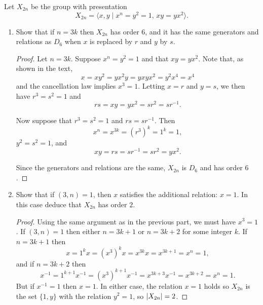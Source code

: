  Let $X_{2n}$ be the group with presentation
\begin{equation*}
  X_{2n} = \langle x, y \mid x^n = y^2 = 1,\,xy = yx^2\rangle.
\end{equation*}
\begin{enumerate}
\item Show that if $n = 3k$ then $X_{2n}$ has order $6$, and it has
  the same generators and relations as $D_6$ when $x$ is replaced by
  $r$ and $y$ by $s$.
  \begin{proof}
    Let $n = 3k$. Suppose $x^n = y^2 = 1$ and that $xy =
    yx^2$. Note that, as shown in the text,
    \begin{equation*}
      x = xy^2 = yx^2y = yxyx^2 = y^2x^4 = x^4
    \end{equation*}
    and the cancellation law implies $x^3 = 1$. Letting $x = r$ and
    $y = s$, we then have $r^3 = s^2 = 1$ and
    \begin{equation*}
      rs = xy = yx^2 = sr^2 = sr^{-1}.
    \end{equation*}

    Now suppose that $r^3 = s^2 = 1$ and $rs = sr^{-1}$. Then
    \begin{equation*}
      x^n = x^{3k} = (r^3)^k = 1^k = 1,
    \end{equation*}
    $y^2 = s^2 = 1$, and
    \begin{equation*}
      xy = rs = sr^{-1} = sr^2 = yx^2.
    \end{equation*}

    Since the generators and relations are the same, $X_{2n}$ is $D_6$
    and has order $6$.
  \end{proof}
\item Show that if $(3,n) = 1$, then $x$ satisfies the additional
  relation: $x = 1$. In this case deduce that $X_{2n}$ has order $2$.
  \begin{proof}
    Using the same argument as in the previous part, we must have
    $x^3 = 1$. If $(3,n) = 1$ then either $n = 3k + 1$ or $n = 3k + 2$
    for some integer $k$. If $n = 3k + 1$ then
    \begin{equation*}
      x = 1^kx = (x^3)^kx = x^{3k}x = x^{3k+1} = x^n = 1,
    \end{equation*}
    and if $n = 3k + 2$ then
    \begin{equation*}
      x^{-1} = 1^{k+1}x^{-1} = (x^3)^{k+1}x^{-1} = x^{3k+3}x^{-1}
      = x^{3k+2} = x^n = 1.
    \end{equation*}
    But if $x^{-1} = 1$ then $x = 1$. In either case, the relation
    $x = 1$ holds so $X_{2n}$ is the set $\{1, y\}$ with the relation
    $y^2 = 1$, so $\lvert{X_{2n}}\rvert = 2$.
  \end{proof}
\end{enumerate}

